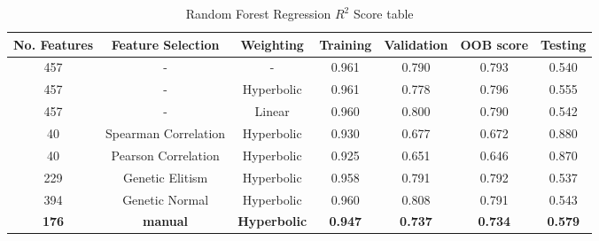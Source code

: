 \documentclass[11pt]{article}
\begin{document}
\begin{table} [h!]
\centering
\resizebox{\linewidth}{!} {
 \begin{tabular}{ | c | c |  c | c | c | c | c |}
\hline
\textbf{No.  Features} & \textbf{Feature Selection} & \textbf{Weighting} & \textbf{Training} & \textbf{Validation} & \textbf{OOB score} & \textbf{Testing} \\ [0.5 ex]
\hline \hline
457 & - & - & 0.961 & 0.790 & 0.793 & 0.540\\
457 & - & Hyperbolic &  0.961 & 0.778 & 0.796 & 0.555\\
457 & - & Linear &  0.960 & 0.800 & 0.790 & 0.542\\
40 & Spearman Correlation & Hyperbolic &  0.930 & 0.677 & 0.672 & 0.880  \\ 
40 & Pearson Correlation & Hyperbolic &  0.925 & 0.651 & 0.646 & 0.870  \\ 
229 & Genetic Elitism & Hyperbolic  & 0.958 &  0.791 & 0.792 & 0.537 \\
394 & Genetic Normal& Hyperbolic & 0.960 & 0.808 & 0.791 & 0.543 \\
\textbf{176} & \textbf{manual}  & \textbf{Hyperbolic} &  \textbf{0.947} & \textbf{0.737} & \textbf{0.734} & \textbf{0.579}  \\ [1ex]
\hline
\end{tabular}
}
\caption{Random Forest Regression $R^2$ Score table}
\label {table:3}
\end{table}
\end{document}

